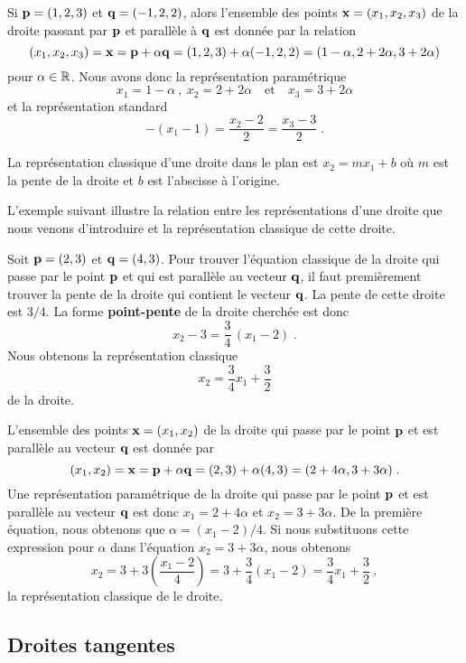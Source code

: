 {\begin{egg}
Si $\mathbf{p}=(1,2,3)$ et $\mathbf{q}=(-1,2,2)$, alors l'ensemble des points
$\mathbf{x}=(x_1,x_2,x_3)$ de la droite passant par $\mathbf{p}$ et
parallèle à $\mathbf{q}$ est donnée par la relation
\[
(x_1,x_2,x_3) = \mathbf{x} = \mathbf{p} + \alpha \mathbf{q} = (1,2,3) + \alpha (-1,2,2)
= (1-\alpha, 2 +2 \alpha, 3 + 2\alpha)
\]
pour $\alpha \in \mathbb{R}$.  Nous avons donc la représentation paramétrique
\[
x_1 = 1-\alpha \ , \ x_2 = 2+2\alpha \quad \text{et} \quad x_3 = 3+2\alpha
\]
et la représentation standard
\[
- (x_1-1) = \frac{x_2-2}{2} = \frac{x_3-3}{2} \; .
\]
\end{egg}

\begin{egg}
La représentation classique d'une droite dans le plan est $x_2=m x_1+b$
où $m$ est la pente de la droite et $b$ est l'abscisse à l'origine.

L'exemple suivant illustre la relation entre les représentations
d'une droite que nous venons d'introduire et la représentation
classique de cette droite.

Soit $\mathbf{p}=(2,3)$ et $\mathbf{q} = (4,3)$.  Pour trouver l'équation
classique de la droite qui passe par le point $\mathbf{p}$ et qui est
parallèle au vecteur $\mathbf{q}$, il faut premièrement trouver la pente
de la droite qui contient le vecteur $\mathbf{q}$.  La pente de
cette droite est $3/4$.  La forme {\bfseries point-pente} de la droite
cherchée est donc
\[
x_2-3 = \frac{3}{4}\, (x_1 - 2) \; .
\]
Nous obtenons la représentation classique
\[
x_2 = \frac{3}{4} x_1 + \frac{3}{2}
\]
de la droite.

L'ensemble des points $\mathbf{x}=(x_1,x_2)$ de la droite qui passe par le
point $\mathbf{p}$ et est parallèle au vecteur $\mathbf{q}$ est donnée par
\[
(x_1,x_2) = \mathbf{x} = \mathbf{p} + \alpha \mathbf{q}
= (2,3) + \alpha (4,3) = (2+ 4\alpha, 3 +3\alpha) \; .
\]
Une représentation paramétrique de la droite qui passe par le point
$\mathbf{p}$ et est parallèle au vecteur $\mathbf{q}$ est donc
$x_1 = 2 + 4 \alpha$ et $x_2 = 3 + 3 \alpha$.  De la première
équation, nous obtenons que $\alpha = (x_1-2)/4$.  Si
nous substituons cette expression pour $\alpha$ dans l'équation
$x_2 = 3 + 3 \alpha$, nous obtenons
\[
x_2 = 3 + 3 \left(\frac{x_1-2}{4}\right) = 3 + \frac{3}{4} (x_1-2)
= \frac{3}{4} x_1 + \frac{3}{2} \ ,
\]
la représentation classique de le droite.
\end{egg}

\subsection{Droites tangentes}

}
